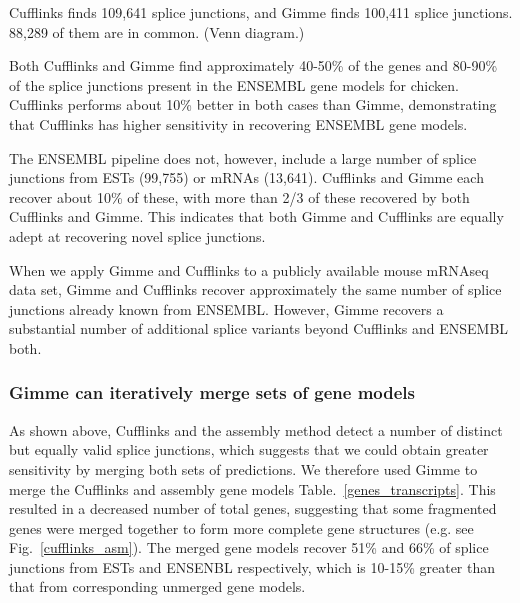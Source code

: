 \documentclass[10pt]{article}
\begin{document}
Cufflinks finds 109,641 splice junctions, and Gimme finds 100,411
splice junctions.  88,289 of them are in common.  (Venn diagram.)

Both Cufflinks and Gimme find approximately 40-50\% of the genes and
80-90\% of the splice junctions present in the ENSEMBL gene models
for chicken.  Cufflinks performs about 10\% better in both cases
than Gimme, demonstrating that Cufflinks has higher sensitivity
in recovering ENSEMBL gene models.

The ENSEMBL pipeline does not, however, include a large number of
splice junctions from ESTs (99,755) or mRNAs (13,641).  Cufflinks and
Gimme each recover about 10\% of these, with more than 2/3 of these
recovered by both Cufflinks and Gimme.  This indicates that both Gimme
and Cufflinks are equally adept at recovering novel splice junctions.


When we apply Gimme and Cufflinks to a publicly available mouse
mRNAseq data set, Gimme and Cufflinks recover approximately the same
number of splice junctions already known from ENSEMBL.  However, Gimme
recovers a substantial number of additional splice variants beyond
Cufflinks and ENSEMBL both.


\subsubsection*{Gimme can iteratively merge sets of gene models}


As shown above, Cufflinks and the assembly method detect a number of
distinct but equally valid splice junctions, which suggests that we
could obtain greater sensitivity by merging both sets of predictions.
We therefore used Gimme to merge the Cufflinks and assembly gene
models Table.~\ref{genes_transcripts}.  This resulted in a decreased
number of total genes, suggesting that some fragmented genes were
merged together to form more complete gene structures (e.g. see
Fig.~\ref{cufflinks_asm}). The merged gene models recover 51\% and
66\% of splice junctions from ESTs and ENSENBL respectively, which is
10-15\% greater than that from corresponding unmerged gene models.
\end{document}
